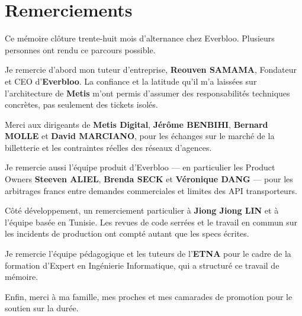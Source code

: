 \chapter*{Remerciements}

Ce mémoire clôture trente-huit mois d'alternance chez Everbloo. Plusieurs personnes ont rendu ce parcours possible.

\vspace{0.4cm}

Je remercie d'abord mon tuteur d'entreprise, \textbf{Reouven SAMAMA}, Fondateur et CEO d'\textbf{Everbloo}. La confiance et la latitude qu'il m'a laissées sur l'architecture de \textbf{Metis} m'ont permis d'assumer des responsabilités techniques concrètes, pas seulement des tickets isolés.

\vspace{0.3cm}

Merci aux dirigeants de \textbf{Metis Digital}, \textbf{Jérôme BENBIHI}, \textbf{Bernard MOLLE} et \textbf{David MARCIANO}, pour les échanges sur le marché de la billetterie et les contraintes réelles des réseaux d'agences.

\vspace{0.3cm}

Je remercie aussi l'équipe produit d'Everbloo --- en particulier les Product Owners \textbf{Steeven ALIEL}, \textbf{Brenda SECK} et \textbf{Véronique DANG} --- pour les arbitrages francs entre demandes commerciales et limites des API transporteurs.

\vspace{0.3cm}

Côté développement, un remerciement particulier à \textbf{Jiong Jiong LIN} et à l'équipe basée en Tunisie. Les revues de code serrées et le travail en commun sur les incidents de production ont compté autant que les specs écrites.

\vspace{0.3cm}

Je remercie l'équipe pédagogique et les tuteurs de l'\textbf{ETNA} pour le cadre de la formation d'Expert en Ingénierie Informatique, qui a structuré ce travail de mémoire.

\vspace{0.3cm}

Enfin, merci à ma famille, mes proches et mes camarades de promotion pour le soutien sur la durée.

\newpage
